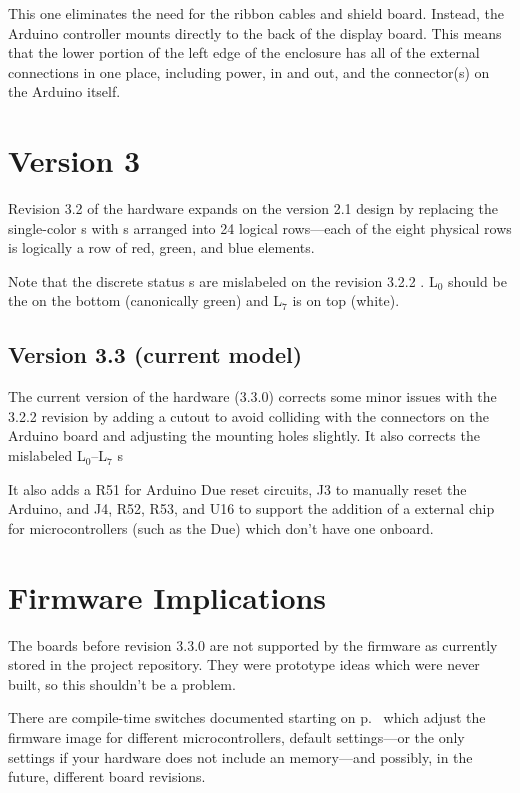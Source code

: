 This one eliminates the need for the ribbon cables and shield board. Instead, the Arduino controller mounts
directly to the back of the display board. This means that the lower portion of the left edge of the enclosure
has all of the external connections in one place, including power,  in and out, and the 
 connector(s) on the Arduino itself.

\section{Version 3}
Revision 3.2 of the hardware expands on the version 2.1 design by replacing the single-color s with
 s arranged into 24 logical rows---each of the eight physical rows is logically a row of red,
green, and blue  elements.

Note that the discrete status s are mislabeled on the revision 3.2.2 . L$_0$ should be the 
on the bottom (canonically green) and L$_7$ is on top (white).

\subsection{Version 3.3 (current model)}
The current version of the hardware (3.3.0) corrects some minor issues with the 3.2.2 revision by adding a cutout to avoid colliding with the
connectors on the Arduino board and adjusting the mounting holes slightly. It also corrects the mislabeled L$_0$--L$_7$ s

It also adds a R51 for Arduino Due reset circuits, J3 to manually reset the Arduino, and J4, R52, R53, and U16 to support the addition of a external
 chip for microcontrollers (such as the Due) which don't have one onboard.

\section{Firmware Implications}
The boards before  revision 3.3.0 are not supported by the firmware as currently stored in the project repository. They were prototype ideas
which were never built, so this shouldn't be a problem. 

There are compile-time switches documented starting on p.~\pageref{config-fw} which adjust the firmware
image for different microcontrollers, default settings---or the only settings if your hardware does not
include an  memory---and possibly, in the future, different board revisions.

